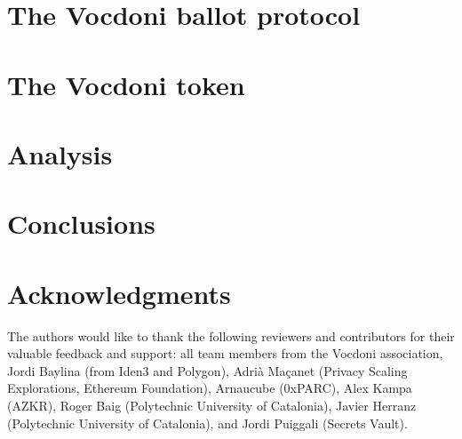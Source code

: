 \documentclass[runningheads, draft]{llncs}
\begin{document}
\section{The Vocdoni ballot protocol}
\label{sec:ballot-protocol}


\section{The Vocdoni token}
\label{sec:token}


\section{Analysis}
\label{sec:analysis}


\section{Conclusions}
\label{sec:conclusions}


\section*{Acknowledgments}
\label{sec:acknowledgments}

The authors would like to thank the following reviewers and contributors for their valuable feedback and support: all team members from the Vocdoni association, Jordi Baylina (from Iden3 and Polygon), Adrià Maçanet (Privacy Scaling Explorations, Ethereum Foundation), Arnaucube (0xPARC), Alex Kampa (AZKR), Roger Baig (Polytechnic University of Catalonia), Javier Herranz (Polytechnic University of Catalonia), and Jordi Puiggali (Secrets Vault).





\end{document}
